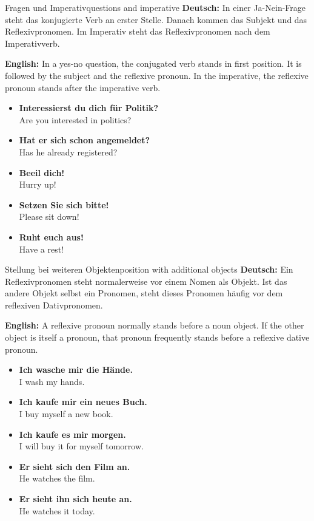\documentclass[a4paper,11pt]{article}
\newcommand{\GermanText}[1]{\textbf{Deutsch: }#1\par}
\newcommand{\EnglishText}[1]{{\small\color{SoftGray}\textbf{English: }#1\par}}
\newcommand{\ExampleItem}[2]{\item \textbf{#1}\\{\small\color{SoftGray}#2}}
\begin{document}
        \begin{grammarentry}{Fragen und Imperativ}{questions and imperative}
            \GermanText{In einer Ja-Nein-Frage steht das konjugierte Verb an erster Stelle. Danach kommen das Subjekt und das Reflexivpronomen. Im Imperativ steht das Reflexivpronomen nach dem Imperativverb.}
            \EnglishText{In a yes-no question, the conjugated verb stands in first position. It is followed by the subject and the reflexive pronoun. In the imperative, the reflexive pronoun stands after the imperative verb.}

            \begin{exbox}
                \begin{itemize}
                    \ExampleItem{Interessierst du dich für Politik?}{Are you interested in politics?}
                    \ExampleItem{Hat er sich schon angemeldet?}{Has he already registered?}
                    \ExampleItem{Beeil dich!}{Hurry up!}
                    \ExampleItem{Setzen Sie sich bitte!}{Please sit down!}
                    \ExampleItem{Ruht euch aus!}{Have a rest!}
                \end{itemize}
            \end{exbox}
        \end{grammarentry}

        \begin{grammarentry}{Stellung bei weiteren Objekten}{position with additional objects}
            \GermanText{Ein Reflexivpronomen steht normalerweise vor einem Nomen als Objekt. Ist das andere Objekt selbst ein Pronomen, steht dieses Pronomen häufig vor dem reflexiven Dativpronomen.}
            \EnglishText{A reflexive pronoun normally stands before a noun object. If the other object is itself a pronoun, that pronoun frequently stands before a reflexive dative pronoun.}

            \begin{exbox}
                \begin{itemize}
                    \ExampleItem{Ich wasche mir die Hände.}{I wash my hands.}
                    \ExampleItem{Ich kaufe mir ein neues Buch.}{I buy myself a new book.}
                    \ExampleItem{Ich kaufe es mir morgen.}{I will buy it for myself tomorrow.}
                    \ExampleItem{Er sieht sich den Film an.}{He watches the film.}
                    \ExampleItem{Er sieht ihn sich heute an.}{He watches it today.}
                \end{itemize}
            \end{exbox}
        \end{grammarentry}
\end{document}
